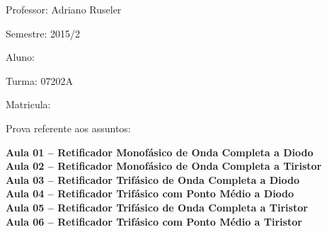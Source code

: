 \documentclass[11pt,paper=a4,answers]{exam}
\begin{document}
\par
\bigskip\bigskip
\begin{minipage}[t]{.6\textwidth}%
	Professor: Adriano Ruseler \par
	Semestre: 2015/2 \par
	Aluno: \makebox[2.5in]{\hrulefill} \par
	
\end{minipage}%
\hfill
\begin{minipage}[t]{.4\textwidth}%
	Turma:  07202A \par
     \par
	Matricula: \makebox[1.5in]{\hrulefill} \par
\end{minipage}
\par
\bigskip


\begin{framed}
	\centering Prova referente aos assuntos:\\ \raggedright
	 \textbf{Aula 01 -- Retificador Monofásico de Onda Completa a Diodo }\\
	 \textbf{Aula 02 – Retificador Monofásico de Onda Completa a Tiristor }\\
	 \textbf{Aula 03 – Retificador Trifásico de Onda Completa a Diodo}\\
	 \textbf{Aula 04 – Retificador Trifásico com Ponto Médio a Diodo}\\
	 \textbf{Aula 05 – Retificador Trifásico de Onda Completa a Tiristor}\\
	 \textbf{Aula 06 – Retificador Trifásico com Ponto Médio a Tiristor}
\end{framed}
\end{document}
